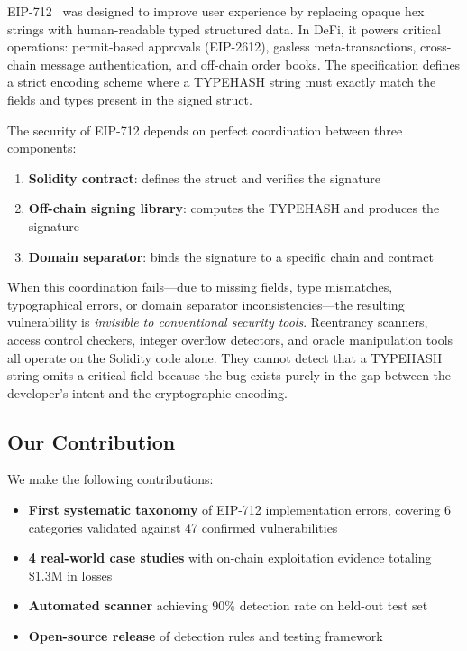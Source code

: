 \documentclass[conference]{IEEEtran}
\begin{document}
EIP-712~\cite{eip712} was designed to improve user experience by replacing opaque hex strings with human-readable typed structured data. In DeFi, it powers critical operations: permit-based approvals (EIP-2612), gasless meta-transactions, cross-chain message authentication, and off-chain order books. The specification defines a strict encoding scheme where a TYPEHASH string must exactly match the fields and types present in the signed struct.

The security of EIP-712 depends on perfect coordination between three components:
\begin{enumerate}
    \item \textbf{Solidity contract}: defines the struct and verifies the signature
    \item \textbf{Off-chain signing library}: computes the TYPEHASH and produces the signature
    \item \textbf{Domain separator}: binds the signature to a specific chain and contract
\end{enumerate}

When this coordination fails---due to missing fields, type mismatches, typographical errors, or domain separator inconsistencies---the resulting vulnerability is \textit{invisible to conventional security tools}. Reentrancy scanners, access control checkers, integer overflow detectors, and oracle manipulation tools all operate on the Solidity code alone. They cannot detect that a TYPEHASH string omits a critical field because the bug exists purely in the gap between the developer's intent and the cryptographic encoding.

\subsection{Our Contribution}

We make the following contributions:
\begin{itemize}
    \item \textbf{First systematic taxonomy} of EIP-712 implementation errors, covering 6 categories validated against 47 confirmed vulnerabilities
    \item \textbf{4 real-world case studies} with on-chain exploitation evidence totaling \$1.3M in losses
    \item \textbf{Automated scanner} achieving 90\% detection rate on held-out test set
    \item \textbf{Open-source release} of detection rules and testing framework
\end{itemize}
\end{document}
